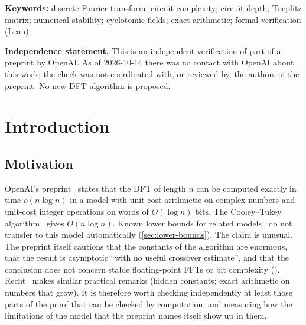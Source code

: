 \documentclass[11pt]{article}
\theoremstyle{plain}
\begin{document}
\noindent\textbf{Keywords:} discrete Fourier transform; circuit complexity; circuit depth; Toeplitz matrix; numerical stability; cyclotomic fields; exact arithmetic; formal verification (Lean).

\medskip
\noindent\textbf{Independence statement.} This is an independent verification of part of a preprint by OpenAI. As of 2026-10-14 there was no contact with OpenAI about this work; the check was not coordinated with, or reviewed by, the authors of the preprint. No new DFT algorithm is proposed.

\section{Introduction}\label{sec:intro}

\subsection{Motivation}
OpenAI's preprint~\citep{openai2026} states that the DFT of length $n$ can be computed exactly in time $o(n\log n)$ in a model with unit-cost arithmetic on complex numbers and unit-cost integer operations on words of $O(\log n)$ bits. The Cooley--Tukey algorithm~\citep{cooley1965} gives $O(n\log n)$. Known lower bounds for related models~\citep{morgenstern1973,ailon2013,ailon2014} do not transfer to this model automatically (\cref{sec:lower-bounds}). The claim is unusual. The preprint itself cautions that the constants of the algorithm are enormous, that the result is asymptotic ``with no useful crossover estimate'', and that the conclusion does not concern stable floating-point FFTs or bit complexity (). Recht~\citep{recht2026} makes similar practical remarks (hidden constants; exact arithmetic on numbers that grow). It is therefore worth checking independently at least those parts of the proof that can be checked by computation, and measuring how the limitations of the model that the preprint names itself show up in them.
\end{document}
